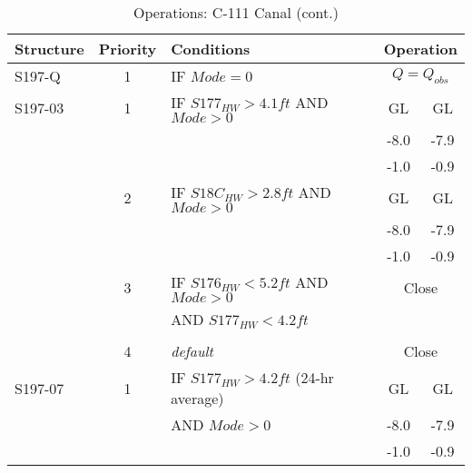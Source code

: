 \clearpage


\scriptsize
\begin{table}[!h]
\centering
\caption{Operations: C-111 Canal (cont.)}
\label{tab:M11opsC111d}
\begin{tabular}{|l|c|l|c|c|}
\hline
\textbf{Structure} & \textbf{Priority}  & \textbf{Conditions} & \multicolumn{2}{|c|}{\textbf{Operation}}   \\
\hline
\hline
S197-Q        &  1  & IF $Mode=0$                            & \multicolumn{2}{|c|}{$Q = Q_{obs}$}   \\
\hline
\hline

S197-03       &  1  & IF $S177_{HW}>4.1 ft$ AND $Mode>0$     & GL    & GL    \\
              &     &                                        & -8.0  & -7.9  \\
              &     &                                        & -1.0  & -0.9  \\
\hline
              &  2  & IF $S18C_{HW}>2.8 ft$ AND $Mode>0$     & GL    & GL    \\
              &     &                                        & -8.0  & -7.9  \\
              &     &                                        & -1.0  & -0.9  \\
\hline
              &  3  & IF $S176_{HW}<5.2 ft$ AND $Mode>0$     & \multicolumn{2}{|c|}{Close}  \\
              &     & AND $S177_{HW}<4.2 ft$                 & \multicolumn{2}{|c|}{}    \\
              &     &                                        & \multicolumn{2}{|c|}{}     \\
\hline
              &  4  & \it{default}                           & \multicolumn{2}{|c|}{Close}           \\
\hline
\hline
S197-07       &  1  & IF $S177_{HW}>4.2 ft$ (24-hr average)  & GL    & GL    \\
              &     & AND $Mode>0$                           & -8.0  & -7.9  \\
              &     &                                        & -1.0  & -0.9  \\

\end{tabular}
\end{table}
